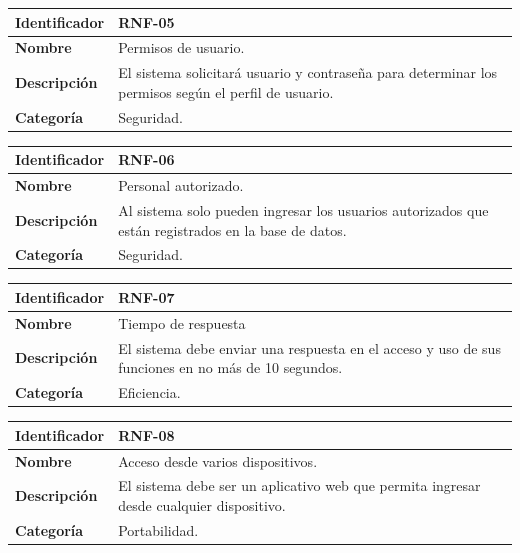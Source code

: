 \documentclass[12pt,a4paper]{article}
\begin{document}
\begin{center}
\begin{tabular}{|m{5.5cm}|m{9.5cm}|}
\hline
\textbf{Identificador} & RNF-05\\
\hline
\textbf{Nombre} & Permisos de usuario.\\
\hline
\textbf{Descripción} & El sistema solicitará usuario y contraseña para determinar los permisos según el perfil de usuario.\\
\hline
\textbf{Categoría} & Seguridad.\\
\hline
\end{tabular}
\vspace{5mm}

\begin{tabular}{|m{5.5cm}|m{9.5cm}|}
\hline
\textbf{Identificador} & RNF-06\\
\hline
\textbf{Nombre} & Personal autorizado.\\
\hline
\textbf{Descripción} & Al sistema solo pueden ingresar los usuarios autorizados que están registrados en la base de datos.\\
\hline
\textbf{Categoría} & Seguridad.\\
\hline
\end{tabular}
\vspace{5mm}

\begin{tabular}{|m{5.5cm}|m{9.5cm}|}
\hline
\textbf{Identificador} & RNF-07\\
\hline
\textbf{Nombre} & Tiempo de respuesta\\
\hline
\textbf{Descripción} & El sistema debe enviar una respuesta en el acceso y uso de sus funciones en no más de 10 segundos.\\
\hline
\textbf{Categoría} & Eficiencia.\\
\hline
\end{tabular}
\vspace{5mm}

\begin{tabular}{|m{5.5cm}|m{9.5cm}|}
\hline
\textbf{Identificador} & RNF-08\\
\hline
\textbf{Nombre} & Acceso desde varios dispositivos.\\
\hline
\textbf{Descripción} & El sistema debe ser un aplicativo web que permita ingresar desde cualquier dispositivo.\\
\hline
\textbf{Categoría} & Portabilidad.\\
\hline
\end{tabular}
\vspace{5mm}
\end{center}
\end{document}
